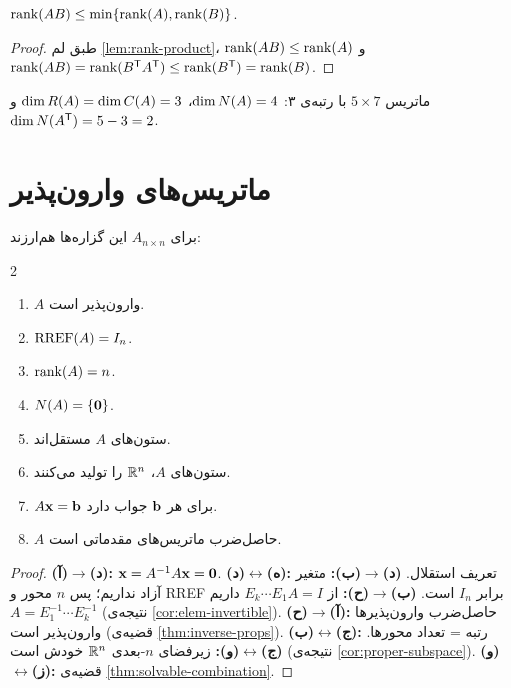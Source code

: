 \begin{theorem}\label{thm:rank-AB}
$\operatorname{rank}(AB)\le\min\{\operatorname{rank}(A),\operatorname{rank}(B)\}$.
\end{theorem}
\begin{proof}
طبق لم \ref{lem:rank-product}، $\operatorname{rank}(AB)\le\operatorname{rank}(A)$ و $\operatorname{rank}(AB)=\operatorname{rank}(B^{\mathsf{T}} A^{\mathsf{T}})\le\operatorname{rank}(B^{\mathsf{T}})=\operatorname{rank}(B)$.
\end{proof}

\begin{example}
ماتریس $5\times7$ با رتبه‌ی ۳: $\dim N(A)=4$، $\dim R(A)=\dim C(A)=3$ و $\dim N(A^{\mathsf{T}})=5-3=2$.
\end{example}

\section{ماتریس‌های وارون‌پذیر}

\begin{theorem}\label{thm:imt}
برای $A_{n\times n}$ این گزاره‌ها هم‌ارزند:
\begin{multicols}{2}
\begin{enumerate}[label=(\alph*)]
  \item $A$ وارون‌پذیر  است.
  \item $\operatorname{RREF}(A)=I_n$.
  \item $\operatorname{rank}(A)=n$.
  \item $N(A)=\{\mathbf{0}\}$.
  \item ستون‌های $A$ مستقل‌اند.
  \item ستون‌های $A$، $\mathbb{R}^n$ را تولید می‌کنند.
  \item $A\mathbf{x}=\mathbf{b}$ برای هر $\mathbf{b}$ جواب دارد.
  \item $A$ حاصل‌ضرب ماتریس‌های مقدماتی است.
\end{enumerate}
\end{multicols}
\end{theorem}
\begin{proof}
\textbf{(آ)$\to$(د):} $\mathbf{x}=A^{-1}A\mathbf{x}=\mathbf{0}$.
\textbf{(د)$\leftrightarrow$(ه):} تعریف استقلال.
\textbf{(د)$\to$(ب):} متغیر آزاد نداریم؛ پس $n$ محور و RREF برابر $I_n$ است.
\textbf{(ب)$\to$(ح):} از $E_k\cdots E_1A=I$ داریم $A=E_1^{-1}\cdots E_k^{-1}$ (نتیجه‌ی \ref{cor:elem-invertible}).
\textbf{(ح)$\to$(آ):} حاصل‌ضرب وارون‌پذیرها وارون‌پذیر است (قضیه‌ی \ref{thm:inverse-props}).
\textbf{(ب)$\leftrightarrow$(ج):} رتبه = تعداد محورها.
\textbf{(ج)$\leftrightarrow$(و):} زیرفضای $n$-بعدی $\mathbb{R}^n$ خودش است (نتیجه‌ی \ref{cor:proper-subspace}).
\textbf{(و)$\leftrightarrow$(ز):} قضیه‌ی \ref{thm:solvable-combination}.
\end{proof}

